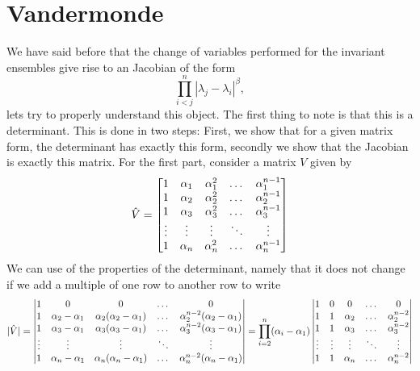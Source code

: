\section{Vandermonde}

We have said before that the change of variables performed for the invariant ensembles give rise to an Jacobian of the form
\[
	\prod_{i<j}^n |\lambda_j - \lambda_i|^\beta,
\]
lets try to properly understand this object. The first thing to note is that this is a determinant. This is done in two steps: First, we show that for a given matrix form, the determinant has exactly this form, secondly we show that the Jacobian is exactly this matrix. For the first part, consider a matrix $V$ given by 
\[
\hat V = 
\begin{bmatrix}
	1 & \alpha_1 & \alpha_1^2 & \dots & \alpha_1^{n-1} \\
	1 & \alpha_2 & \alpha_2^2 & \dots & \alpha_2^{n-1} \\
	1 & \alpha_3 & \alpha_3^2 & \dots & \alpha_3^{n-1} \\
	\vdots & \vdots & \vdots & \ddots & \vdots \\
	1 & \alpha_n & \alpha_n^2 & \dots & \alpha_n^{n-1}
\end{bmatrix}
\]
We can use of the properties of the determinant, namely that it does not change if we add a multiple of one row to another row to write
\[
|\hat V|=
\begin{vmatrix}
	1 & 0 & 0 & \dots & 0 \\
	1 & \alpha_2 - \alpha_1 & \alpha_2(\alpha_2 - \alpha_1) & \dots & \alpha_2^{n-2}(\alpha_2 - \alpha_1) \\
	1 & \alpha_3 - \alpha_1& \alpha_3(\alpha_3 - \alpha_1) & \dots & \alpha_3^{n-2} (\alpha_3 - \alpha_1)\\
	\vdots & \vdots & \vdots & \ddots & \vdots \\
	1 & \alpha_n- \alpha_1 & \alpha_n(\alpha_n - \alpha_1) & \dots & \alpha_n^{n-2}(\alpha_n - \alpha_1)
\end{vmatrix}
= \prod_{i=2}^n (\alpha_i - \alpha_1)
\begin{vmatrix}
	1 & 0 & 0 & \dots & 0 \\
	1 & 1 & \alpha_2 & \dots & \alpha_2^{n-2} \\
	1 & 1 & \alpha_3 & \dots & \alpha_3^{n-2} \\
	\vdots & \vdots & \vdots & \ddots & \vdots \\
	1 & 1 & \alpha_n & \dots & \alpha_n^{n-2}
\end{vmatrix}
\]
